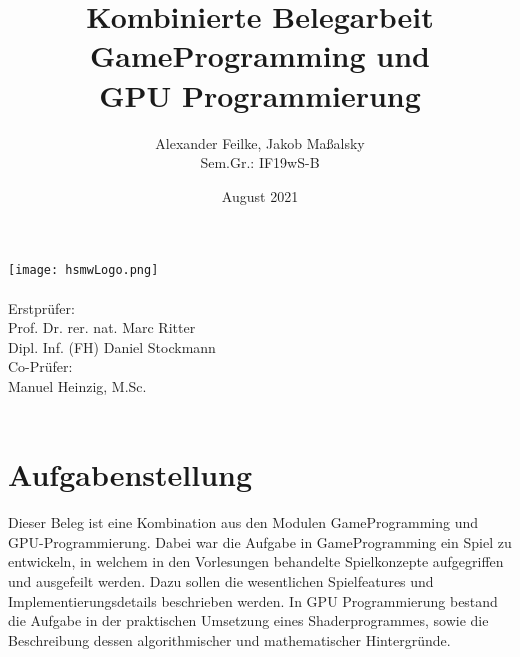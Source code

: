 \documentclass[a4paper,ngerman,12pt]{report}
\title{Kombinierte Belegarbeit \\ GameProgramming und \\ GPU Programmierung}
\author{Alexander Feilke, Jakob Ma{\ss}alsky \\ Sem.Gr.: IF19wS-B}
\date{August 2021}
\begin{document}

\normalfont

\makeatletter
\begin{titlepage}
\begin{center}
    \texttt{[image: hsmwLogo.png]}\\[10ex]
    {\huge \@title}\\[10ex]
    {\Large Erstprüfer: \\
        Prof. Dr. rer. nat. Marc Ritter \\
        Dipl. Inf. (FH) Daniel Stockmann \\ \vspace{1em}
        Co-Prüfer: \\ Manuel Heinzig, M.Sc.
    }\\[20ex]
    {\Large \@author}\\[10ex]
    {\large \@date}
\end{center}
\end{titlepage}
\makeatother


\renewcommand{\contentsname}{Inhaltsverzeichnis}
\tableofcontents
\newpage


\sloppy
\flushbottom



\chapter{Aufgabenstellung}

Dieser Beleg ist eine Kombination aus den Modulen GameProgramming und GPU-Programmierung. Dabei war die Aufgabe in GameProgramming ein Spiel zu entwickeln, in welchem in den Vorlesungen behandelte Spielkonzepte aufgegriffen und ausgefeilt werden. Dazu sollen die wesentlichen Spielfeatures und Implementierungsdetails beschrieben werden. In GPU Programmierung bestand die Aufgabe in der praktischen Umsetzung eines Shaderprogrammes, sowie die Beschreibung dessen algorithmischer und mathematischer Hintergründe.







\end{document}
